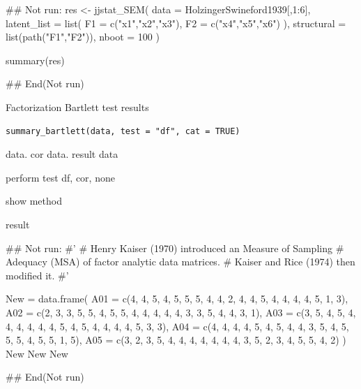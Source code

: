 \documentclass[a4paper]{book}
\begin{document}
%
\begin{Examples}
\begin{ExampleCode}
\#\# Not run: 
res <- jjstat_SEM(
  data = HolzingerSwineford1939[,1:6],
  latent_list = list(
    F1 = c("x1","x2","x3"),
    F2 = c("x4","x5","x6")
  ),
  structural = list(path("F1","F2")),
  nboot = 100
)

summary(res)

## End(Not run)
\end{ExampleCode}
\end{Examples}
%
\begin{Description}
Factorization Bartlett test results
\end{Description}
%
\begin{Usage}
\begin{verbatim}
summary_bartlett(data, test = "df", cat = TRUE)
\end{verbatim}
\end{Usage}
%
\begin{Arguments}
\begin{ldescription}
\item[\code{data}] data. cor data. result data

\item[\code{test}] perform test df, cor, none

\item[\code{cat}] show method
\end{ldescription}
\end{Arguments}
%
\begin{Value}
result
\end{Value}
%
\begin{Examples}
\begin{ExampleCode}

\#\# Not run: 
#'
# Henry Kaiser (1970) introduced an Measure of Sampling
# Adequacy  (MSA) of factor analytic data matrices.
# Kaiser and Rice (1974) then modified it.
#'

New = data.frame(
  A01 = c(4, 4, 5, 4, 5, 5, 5, 4, 4, 2, 4, 4, 5, 4, 4, 4, 4, 5, 1, 3),
  A02 = c(2, 3, 3, 5, 5, 4, 5, 5, 4, 4, 4, 4, 4, 3, 3, 5, 4, 4, 3, 1),
  A03 = c(3, 5, 4, 5, 4, 4, 4, 4, 4, 4, 5, 4, 5, 4, 4, 4, 4, 5, 3, 3),
  A04 = c(4, 4, 4, 4, 5, 4, 5, 4, 4, 3, 5, 4, 5, 5, 5, 4, 5, 5, 1, 5),
  A05 = c(3, 2, 3, 5, 4, 4, 4, 4, 4, 4, 4, 3, 5, 2, 3, 4, 5, 5, 4, 2)
)
New %
New %
New %


## End(Not run)
\end{ExampleCode}
\end{Examples}
\end{document}
